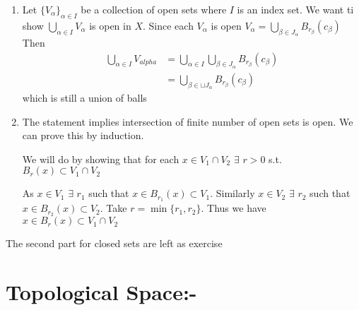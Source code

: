 \begin{myproof}
	\begin{enumerate}
		\item Let $\{V_{\alpha}\}_{\alpha\in I}$ be a collection of open sets where $I$ is an index set. We want ti show $\bigcup\limits_{\alpha\in I}V_{\alpha}$ is open in $X$. Since each $V_{\alpha}$ is open $V_{\alpha}=\bigcup\limits_{\beta \in J_{\alpha}} B_{r_{\beta}}(c_{\beta})$ Then \begin{align*}
			\bigcup\limits_{\alpha\in I} V_{alpha} & =\bigcup\limits_{\alpha\in I}\bigcup\limits_{\beta \in J_{\alpha}}B_{r_{\beta}}(c_{\beta}) \\
			& =\bigcup\limits_{\beta \in \sqcup J_{\alpha}}B_{r_{\beta}}(c_{\beta})
		\end{align*} which is still a union of balls
	\Qed
	\item \setlength{\parindent}{1cm}The statement implies intersection of finite number of open sets is open. We can prove this by induction. 
	
	We will do by showing that for each $x\in V_1\cap V_2$ $\exists$ $r>0$ s.t. $B_r(x)\subset V_1\cap V_2$
	 
	 	\begin{center}
	 \end{center}
 As $x\in V_1$ $\exists$ $r_1$ such that $x\in B_{r_1}(x)\subset V_1$. Similarly $x\in V_2$ $\exists$ $r_2$ such that $x\in B_{r_2}(x)\subset V_2$. Take $r=\min\{r_1,r_2\}$. Thus we have $x\in B_r(x)\subset V_1\cap V_2$
	
	\end{enumerate}
The second part for closed sets are left as exercise
\end{myproof}

\section{Topological Space:-}


